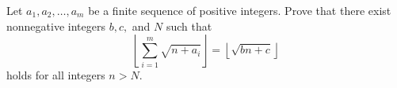 Let $a_1,a_2,\dots,a_m$ be a finite sequence of positive integers. Prove that there exist nonnegative integers $b,c,$ and $N$ such that \[\left\lfloor \sum_{i=1}^m \sqrt{n+a_i} \right\rfloor =\left\lfloor \sqrt{bn+c} \right\rfloor\] holds for all integers $n>N$.